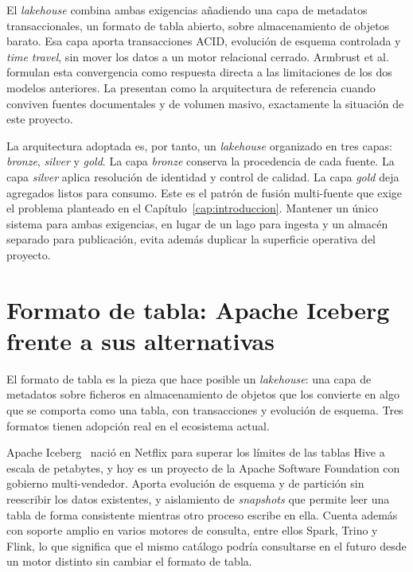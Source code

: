 El \textit{lakehouse} combina ambas exigencias añadiendo una capa de
metadatos transaccionales, un formato de tabla abierto, sobre
almacenamiento de objetos barato. Esa capa aporta transacciones ACID,
evolución de esquema controlada y \textit{time travel}, sin mover los
datos a un motor relacional cerrado. Armbrust et al.~\cite{armbrust_lakehouse_2021}
formulan esta convergencia como respuesta directa a las limitaciones de
los dos modelos anteriores. La presentan como la arquitectura de
referencia cuando conviven fuentes documentales y de volumen masivo,
exactamente la situación de este proyecto.

La arquitectura adoptada es, por tanto, un \textit{lakehouse} organizado
en tres capas: \textit{bronze}, \textit{silver} y \textit{gold}. La capa
\textit{bronze} conserva la procedencia de cada fuente. La capa
\textit{silver} aplica resolución de identidad y control de calidad. La
capa \textit{gold} deja agregados listos para consumo. Este es el patrón
de fusión multi-fuente que exige el problema planteado en el
Capítulo~\ref{cap:introduccion}. Mantener un único sistema para ambas
exigencias, en lugar de un lago para ingesta y un almacén separado para
publicación, evita además duplicar la superficie operativa del proyecto.

\section{Formato de tabla: Apache Iceberg frente a sus alternativas}
\label{sec:estado_arte_iceberg}

El formato de tabla es la pieza que hace posible un \textit{lakehouse}:
una capa de metadatos sobre ficheros en almacenamiento de objetos que los
convierte en algo que se comporta como una tabla, con transacciones y
evolución de esquema. Tres formatos tienen adopción real en el ecosistema
actual.

Apache Iceberg~\cite{apache_iceberg_docs} nació en Netflix para superar
los límites de las tablas Hive a escala de petabytes, y hoy es un proyecto
de la Apache Software Foundation con gobierno multi-vendedor. Aporta
evolución de esquema y de partición sin reescribir los datos existentes, y
aislamiento de \textit{snapshots} que permite leer una tabla de forma
consistente mientras otro proceso escribe en ella. Cuenta además con
soporte amplio en varios motores de consulta, entre ellos Spark, Trino y
Flink, lo que significa que el mismo catálogo podría consultarse en el
futuro desde un motor distinto sin cambiar el formato de tabla.


